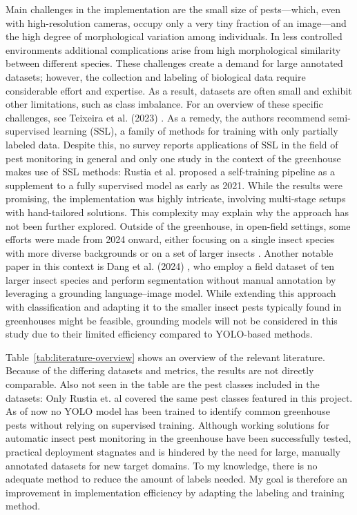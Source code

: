 \documentclass[12pt, a4paper]{article}
\begin{document}
Main challenges in the implementation are the small size of pests—which, even with high-resolution cameras, occupy only a very tiny fraction of an image—and the high degree of morphological variation among individuals. In less controlled environments additional complications arise from high morphological similarity between different species.
These challenges create a demand for large annotated datasets; however, the collection and labeling of biological data require considerable effort and expertise. As a result, datasets are often small and exhibit other limitations, such as class imbalance. For an overview of these specific challenges, see Teixeira et al. (2023) \cite{survey2023}. As a remedy, the authors recommend semi-supervised learning (SSL), a family of methods for training with only partially labeled data. Despite this, no survey reports applications of SSL in the field of pest monitoring in general and only one study in the context of the greenhouse makes use of SSL methods: Rustia et al. \cite{rustia_online_2021} proposed a self-training pipeline as a supplement to a fully supervised model as early as 2021. While the results were promising, the implementation was highly intricate, involving multi-stage setups with hand-tailored solutions. This complexity may explain why the approach has not been further explored. Outside of the greenhouse, in open-field settings, some efforts were made from 2024 onward, either focusing on a single insect species with more diverse backgrounds or on a set of larger insects \cite{li_mateacher_2024, majewski_improved_2024, zhou_mutual_2024, zhou_perceptive_2025, gomez-zamanillo_semi-supervised_2025}. Another notable paper in this context is Dang et al. (2024) \cite{dang_efficient_2024}, who employ a field dataset of ten larger insect species and perform segmentation without manual annotation by leveraging a grounding language–image model. While extending this approach with classification and adapting it to the smaller insect pests typically found in greenhouses might be feasible, grounding models will not be considered in this study due to their limited efficiency compared to YOLO-based methods. 

Table~\ref{tab:literature-overview} shows an overview of the relevant literature. Because of the differing datasets and metrics, the results are not directly comparable. Also not seen in the table are the pest classes included in the datasets: Only Rustia et. al \cite{rustia_automatic_2021} covered the same pest classes featured in this project. As of now no YOLO model has been trained to identify common greenhouse pests without relying on supervised training. Although working solutions for automatic insect pest monitoring in the greenhouse have been successfully tested, practical deployment stagnates and is hindered by the need for large, manually annotated datasets for new target domains. To my knowledge, there is no adequate method to reduce the amount of labels needed. My goal is therefore an improvement in implementation efficiency by adapting the labeling and training method.
\end{document}
